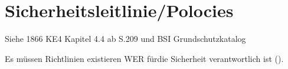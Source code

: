 \section*{Sicherheitsleitlinie/Polocies}
Siehe 1866 KE4 Kapitel 4.4 ab S.209 und BSI Grundschutzkatalog

Es müssen Richtlinien existieren WER fürdie Sicherheit verantwortlich ist (\cite{lipp2007vpn}).